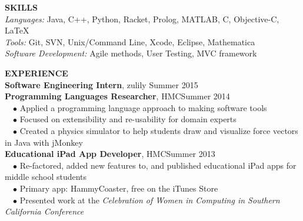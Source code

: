\documentclass[11pt]{article}
\newcommand{\sectionNL}{\\[-2pt]}
\newcommand{\customtab}{$\hspace{10pt} \bullet \hspace{2pt}$}
\newcommand{\HMC}{HMC}
\newcommand{\rightAlign}{\hfill}
\begin{document}
\begin{flushleft}
{\textbf{SKILLS}} \sectionNL
\textit{Languages:} Java, C++, Python, Racket, Prolog, MATLAB, C, Objective-C, \LaTeX \\
\textit{Tools:} Git, SVN, Unix/Command Line, Xcode, Eclipse, Mathematica \\
\textit{Software Development:} Agile methods, User Testing, MVC framework
\end{flushleft}

\begin{flushleft}
{\textbf{EXPERIENCE}} \sectionNL
\textbf{Software Engineering Intern}, zulily \rightAlign Summer 2015 \\

\textbf{Programming Languages Researcher}, \HMC \rightAlign Summer 2014 \\
\customtab Applied a programming language approach to making software tools \\
\customtab Focused on extensibility and re-usability for domain experts \\ 
\customtab Created a physics simulator to help students draw and visualize force vectors in Java with jMonkey\\

\textbf{Educational iPad App Developer}, \HMC \rightAlign Summer 2013 \\
\customtab Re-factored, added new features to, and published educational iPad apps for middle school students \\
\customtab Primary app: HammyCoaster, free on the iTunes Store \\
\customtab Presented work at the \textit{Celebration of Women in Computing in Southern California Conference }
\end{flushleft}
\end{document}
